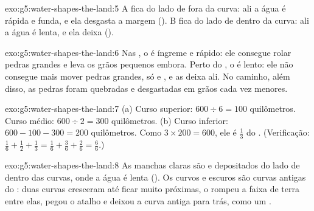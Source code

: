 \begin{solution}{exo:g5:water-shapes-the-land:5}
A fica do lado de fora da curva: ali a água é rápida e funda, e ela
desgasta a margem (). B fica do lado de dentro da curva: ali a água
é lenta, e ela deixa  ().
\end{solution}

\begin{solution}{exo:g5:water-shapes-the-land:6}
Nas , o  é íngreme e rápido: ele consegue rolar pedras grandes
e leva os grãos pequenos embora. Perto do , o  é lento: ele não
consegue mais mover pedras grandes, só  e , e as deixa ali. No
caminho, além disso, as pedras foram quebradas e desgastadas em grãos
cada vez menores.
\end{solution}

\begin{solution}{exo:g5:water-shapes-the-land:7}
(a) Curso superior: $600 \div 6 = 100$ quilômetros. Curso médio:
$600 \div 2 = 300$ quilômetros. (b) Curso inferior: $600 - 100 - 300 = 200$
quilômetros. Como $3 \times 200 = 600$, ele é $\frac{1}{3}$ do .
(Verificação: $\frac{1}{6} + \frac{1}{2} + \frac{1}{3} = \frac{1}{6} +
\frac{3}{6} + \frac{2}{6} = \frac{6}{6}$.)
\end{solution}

\begin{solution}{exo:g5:water-shapes-the-land:8}
As manchas claras são  e  depositados do lado de dentro das
curvas, onde a água é lenta (). Os  curvos e escuros são
curvas antigas do : duas curvas cresceram até ficar muito próximas, o
 rompeu a faixa de terra entre elas, pegou o atalho e deixou a curva
antiga para trás, como um .
\end{solution}

